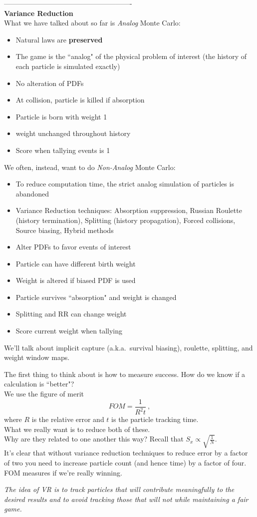 \documentclass[12pt]{article}
\begin{document}
\vspace*{1 em}
-------------------------------------------------------\\
\textbf{Variance Reduction}\\
What we have talked about so far is \textit{Analog} Monte Carlo:
\begin{itemize}
    \item Natural laws are \textbf{preserved}
    \item The game is the ``analog" of the physical problem of interest (the history of each particle is simulated exactly)
    \item No alteration of PDFs
    \item At collision, particle is killed if absorption
    \item Particle is born with weight 1
    \item weight unchanged throughout history
    \item Score when tallying events is 1
\end{itemize}
%
We often, instead, want to do \textit{Non-Analog} Monte Carlo:
\begin{itemize}
    \item To reduce computation time, the strict analog simulation of particles is abandoned
    \item Variance Reduction techniques: Absorption suppression, Russian Roulette (history termination), Splitting (history propagation), Forced collisions, Source biasing, Hybrid methods
    \item Alter PDFs to favor events of interest
    \item Particle can have different birth weight
    \item Weight is altered if biased PDF is used
    \item Particle survives ``absorption" and weight is changed
    \item Splitting and RR can change weight
    \item Score current weight when tallying
\end{itemize}
%
We'll talk about implicit capture (a.k.a.\ survival biasing), roulette, splitting, and weight window maps. 

The first thing to think about is how to measure success. How do we know if a calculation is ``better"?\\
We use the figure of merit
\[
FOM =\frac{1}{R^2 t}\:,
\]
where $R$ is the relative error and $t$ is the particle tracking time.\\
What we really want is to reduce both of these. \\
Why are they related to one another this way? Recall that $S_x \propto \sqrt{\frac{1}{N}}$.\\
It's clear that without variance reduction techniques to reduce error by a factor of two you need to increase particle count (and hence time) by a factor of four.\\
FOM measures if we're really winning.

\textit{The idea of VR is to track particles that will contribute meaningfully to the desired results and to avoid tracking those that will not while maintaining a fair game.}
\end{document}
